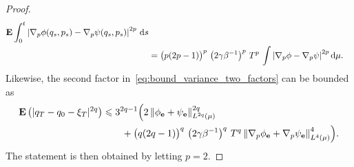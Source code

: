 \documentclass[11pt,a4paper]{article}
\newcommand{\expect}[0]{\mathbf{E}}
\newcommand{\grad}{\nabla}
\newcommand{\vect}[1]{\boldsymbol{\mathbf #1}}
\renewcommand{\d}{\mathrm d}
\theoremstyle{plain}
\numberwithin{equation}{section}
\renewcommand{\leq}{\leqslant}
\begin{document}
\begin{proof}
\begin{align*}
        \expect \int_{0}^{t} \abs{\grad_p \phi(q_s, p_s) - \grad_p \psi(q_s, p_s)}^{2p} \, \d s \\
        &= \bigl(p(2p - 1)\bigr)^p \, \left(2 \gamma \beta^{-1}\right)^p \,  T^{p} \, \int \abs{\grad_p \phi - \grad_p \psi}^{2p} \d \mu.
    \end{align*}
    Likewise, the second factor in~\eqref{eq:bound_variance_two_factors} can be bounded as
    \begin{align*}
        \expect \left( |q_T - q_0 - \xi_T|^{2q} \right)
        &\leq 3^{2q-1} \Bigl( 2 \norm{\phi_{\vect e} + \psi_{\vect e}}[L^{2q}(\mu)]^{2q} \\
        & \qquad + \bigl(q(2q - 1)\bigr)^q \, \left(2 \gamma \beta^{-1}\right)^q \, T^{q} \norm{\grad_p \phi_{\vect e} + \grad_p \psi_{\vect e}}[L^{4}(\mu)]^4 \Bigr).
    \end{align*}
    The statement is then obtained by letting $p = 2$.
\end{proof}
\end{document}
